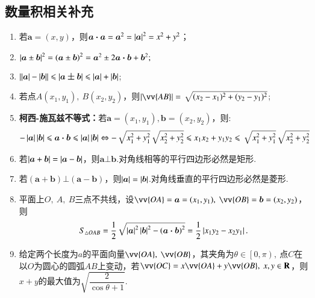 \documentclass{BHCexam}
\begin{document}
\subsection{数量积相关补充}
\begin{enumerate}[(1)]
\item 若$\bm{a}=\left(x,y\right)$，则$ \bm{a}\bm{\cdot}\bm{a}=\bm{a}^2=\left| \bm{a} \right|^2=x^2+y^2 $；
\item $ \left| \bm{a}\pm \bm{b} \right|^2=\left(\bm{a}\pm \bm{b}\right)^2=\bm{a}^2\pm2\bm{a}\bm{\cdot}\bm{b}+\bm{b}^2 ;$
\item $\left| \left| \bm{a} \right|-\left| \bm{b} \right| \right|\leqslant\left| \bm{a\pm b} \right|\leqslant\left| \bm{a} \right|+\left| \bm{b} \right|$;
\item 若点$ A(x_1,y_1),~B(x_2,y_2) $，则$ \abs{\vv{AB}}=\sqrt{(x_2-x_1)^2+(y_2-y_1)^2} $;
\item \textbf{柯西-施瓦兹不等式：}若$\bm{a}=\left(x_1,y_1\right),\bm{b}=\left(x_2,y_2\right)$，则:$$ -\left| \bm{a} \right|\left| \bm{b} \right|\leqslant\bm{a}\bm{\cdot}\bm{b}\leqslant\left| \bm{a} \right|\left| \bm{b} \right|\Leftrightarrow -\sqrt{x_1^2+y_1^2}\sqrt{x_2^2+y_2^2}\leqslant x_1x_2+y_1y_2\leqslant \sqrt{x_1^2+y_1^2}\sqrt{x_2^2+y_2^2}$$
\item 若$ \left| \bm{a}+\bm{b} \right|=\left| \bm{a}-\bm{b} \right| $，则$ \bm{a}\bot\bm{b} $.对角线相等的平行四边形必然是矩形.
\item 若$ \left(\bm{a}+\bm{b}\right)\bm{\bot}\left(\bm{a}-\bm{b}\right) $，则$\left| \bm{a} \right|=\left| \bm{b} \right| $.对角线垂直的平行四边形必然是菱形.
\item 平面上$ O,~A,~B $三点不共线，设$\vv{OA}=\bm{a}=(x_1,y_1) ,~\vv{OB}=\bm{b}=(x_2,y_2)$，则$$ S_{\triangle OAB}=\dfrac{1}{2}\sqrt{\left| \bm{a} \right|^2\left| \bm{b} \right|^2-\left(\bm{a}\bm{\cdot}\bm{b}\right)^2}=\dfrac{1}{2}\left| x_1y_2-x_2y_1 \right| .$$
\item 给定两个长度为$ a $的平面向量$ \vv{OA},~\vv{OB} $，其夹角为$ \theta\in\left[0,\pi \right), ~$点$ C $在以$ O $为圆心的圆弧$ AB $上变动，若$ \vv{OC}=x\vv{OA}+y\vv{OB},~x,y\inR $，则$ x+y $的最大值为$ \sqrt{\dfrac{2}{\cos\theta+1}}. $
\end{enumerate}
\newpage 
\end{document}
